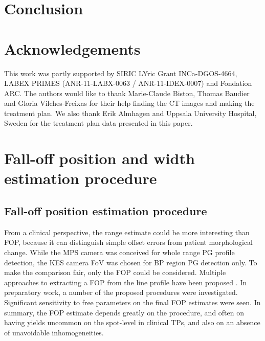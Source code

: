 \documentclass[a4paper,english]{article}
\begin{document}
\section{Conclusion}


\section{Acknowledgements}

This work was partly supported by SIRIC LYric Grant INCa-DGOS-4664, LABEX PRIMES (ANR-11-LABX-0063 / ANR-11-IDEX-0007) and Fondation ARC. The authors would like to thank Marie-Claude Biston, Thomas Baudier and Gloria Vilches-Freixas for their help finding the CT images and making the treatment plan. We also thank Erik Almhagen and Uppsala University Hospital, Sweden for the treatment plan data presented in this paper.

\newpage

\appendix
% 

\section{Fall-off position and width estimation procedure}\label{sec:fopproc}

\subsection{Fall-off position estimation procedure}

From a clinical perspective, the range estimate could be more interesting than FOP, because it can distinguish simple offset errors from patient morphological change. While the MPS camera was conceived for whole range PG profile detection, the KES camera FoV was chosen for BP region PG detection only. To make the comparison fair, only the FOP could be considered. Multiple approaches to extracting a FOP from the line profile have been proposed \citep{Smeets2012,Gueth2013,Roellinghoff2014a,Janssen2014,Sterpin2015}. In preparatory work, a number of the proposed procedures were investigated. Significant sensitivity to free parameters on the final FOP estimates were seen. In summary, the FOP estimate depends greatly on the procedure, and often on having yields uncommon on the spot-level in clinical TPs, and also on an absence of unavoidable inhomogeneities.
\end{document}

